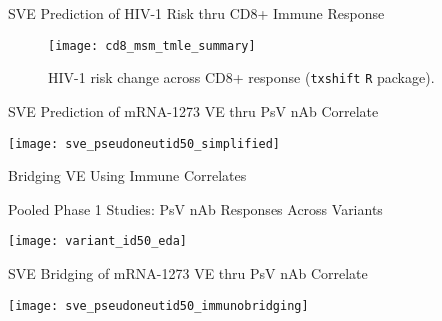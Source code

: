 \documentclass{beamer}
\begin{document}

\begin{frame}[c]{SVE Prediction of HIV-1 Risk thru CD8+ Immune Response}

\vspace{-0.3in}
\begin{figure}[H]
  \centering
  \texttt{[image: cd8\_msm\_tmle\_summary]}
  \captionsetup{labelformat=empty}
  \vspace{-1.5em}
  \caption{
    HIV-1 risk change across CD8+ response (\texttt{txshift} \texttt{R}
    package).
  }
\end{figure}

\note{
}

\end{frame}


\begin{frame}[c]{SVE Prediction of mRNA-1273 VE thru PsV nAb Correlate}

\vspace*{-0.1cm}
\hspace*{-0.3cm}\texttt{[image: sve\_pseudoneutid50\_simplified]}

\note{
}

\end{frame}


\begin{frame}[standout]
  Bridging VE Using Immune Correlates
\end{frame}


\begin{frame}[c]{Pooled Phase 1 Studies: PsV nAb Responses Across Variants}

\vspace*{0.15cm}
\hspace*{-0.8cm}\texttt{[image: variant\_id50\_eda]}

\note{
}

\end{frame}


\begin{frame}[c]{SVE Bridging of mRNA-1273 VE thru PsV nAb Correlate}

\vspace*{-0.1cm}
\hspace*{-0.3cm}\texttt{[image: sve\_pseudoneutid50\_immunobridging]}


\end{frame}
\end{document}
